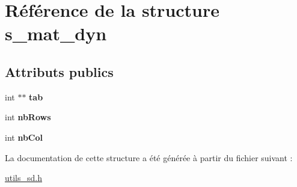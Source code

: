 \hypertarget{structs__mat__dyn}{}\section{Référence de la structure s\+\_\+mat\+\_\+dyn}
\label{structs__mat__dyn}
\subsection*{Attributs publics}
\begin{DoxyCompactItemize}
\item 
\mbox{\label{structs__mat__dyn_aab23f1bd88935bb206db29f64a1a2fbd}} 
int $\ast$$\ast$ {\bfseries tab}
\item 
\mbox{\label{structs__mat__dyn_af225cb03880f5b6d7cfe1ca1bc941988}} 
int {\bfseries nb\+Rows}
\item 
\mbox{\label{structs__mat__dyn_a5c548888f0972f9ff71d2963b3657411}} 
int {\bfseries nb\+Col}
\end{DoxyCompactItemize}


La documentation de cette structure a été générée à partir du fichier suivant \+:\begin{DoxyCompactItemize}
\item 
\hyperlink{utils__sd_8h}{utils\+\_\+sd.\+h}\end{DoxyCompactItemize}
